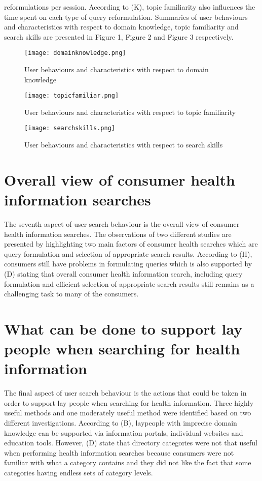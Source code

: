 \documentclass[]{article}
\begin{document}
reformulations per session. According to (K), topic familiarity also influences the time spent on each type of query reformulation. Summaries of user behaviours and characteristics with respect to domain knowledge, topic familiarity and search skills are presented in Figure 1, Figure 2 and Figure 3 respectively.   

\begin{figure}[t!]
	\texttt{[image: domainknowledge.png]}
	\caption{User behaviours and characteristics with respect to domain knowledge\label{fig1}}
\end{figure}  

\begin{figure}[t!]
	\texttt{[image: topicfamiliar.png]}
	\caption{User behaviours and characteristics with respect to topic familiarity\label{fig2}}
\end{figure} 

\begin{figure}[b!]
	\texttt{[image: searchskills.png]}
	\caption{User behaviours and characteristics with respect to search skills\label{fig3}}
\end{figure} 


\section{Overall view of consumer health information searches}
 

The seventh aspect of user search behaviour is the overall view of consumer health information searches. The observations of two different studies are presented by highlighting two main factors of consumer health searches which are query formulation and selection of appropriate search results. According to (H), consumers still have problems in formulating queries which is also supported by (D) stating that overall consumer health information search, including query formulation and efficient selection of appropriate search results still remains as a challenging task to many of the consumers.      


  

  

\section{What can be done to support lay people when searching for health information}

The final aspect of user search behaviour is the actions that could be taken in order to support lay people when searching for health information. Three highly useful methods and one moderately useful method were identified based on two different investigations. According to (B), laypeople with imprecise domain knowledge can be supported via information portals, individual websites and education tools. However, (D) state that directory categories were not that useful when performing health information searches because consumers were not familiar with what a category contains and they did not like the fact that some categories having endless sets of category levels. 
   
\end{document}
